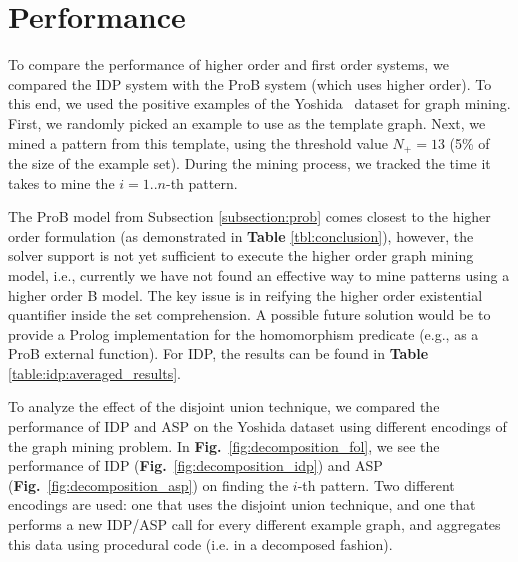 \section{Performance}\label{sec:performance}
To compare the performance of higher order and first order systems, we compared the IDP system with the ProB system (which uses higher order).
To this end, we used the positive examples of the Yoshida~\citep{yoshida_dataset} dataset for graph mining.
First, we randomly picked an example to use as the template graph.
Next, we mined a pattern from this template, using the threshold value $N_{+} = 13$ (5\% of the size of the example set).
During the mining process, we tracked the time it takes to mine the $i=1..n$-th pattern.


The ProB model from Subsection \ref{subsection:prob} comes closest to the higher order formulation (as demonstrated in \textbf{Table} \ref{tbl:conclusion}), however, the solver support is not yet sufficient to execute the higher order graph mining model, i.e., currently we have not found an effective way to mine patterns using a higher order B model. The key issue is in reifying the higher order existential quantifier inside the set comprehension. A possible future solution would be to provide a Prolog implementation for the homomorphism predicate (e.g., as a ProB external function). For IDP, the results can be found in \textbf{Table} \ref{table:idp:averaged_results}.

To analyze the effect of the disjoint union technique, we compared the performance of IDP and ASP on the Yoshida dataset using different encodings of the graph mining problem.
In \textbf{Fig.}~\ref{fig:decomposition_fol}, we see the performance of IDP (\textbf{Fig.}~\ref{fig:decomposition_idp}) and ASP (\textbf{Fig.}~\ref{fig:decomposition_asp}) on finding the $i$-th pattern.
Two different encodings are used: one that uses the disjoint union technique, and one that performs a new IDP/ASP call for every different example graph, and aggregates this data using procedural code (i.e. in a decomposed fashion).

